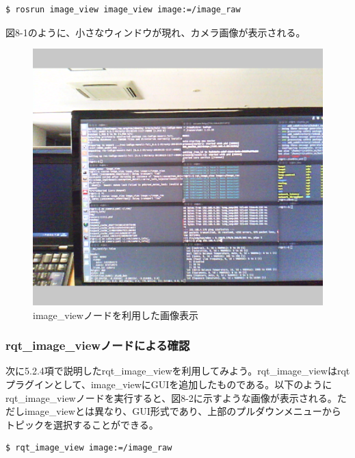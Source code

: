 \begin{lstlisting}[language=ROS]
$ rosrun image_view image_view image:=/image_raw
\end{lstlisting}

図8-1のように、小さなウィンドウが現れ、カメラ画像が表示される。

\begin{figure}[ht]
  \centering
  \includegraphics[width=\columnwidth]{pictures/chapter8/pic_08_01.png}
  \caption{image\_viewノードを利用した画像表示}
\end{figure}


\subsubsection{rqt\_image\_viewノードによる確認}

次に5.2.4項で説明したrqt\_image\_viewを利用してみよう。rqt\_image\_viewはrqtプラグインとして、image\_viewにGUIを追加したものである。以下のようにrqt\_image\_viewノードを実行すると、図8-2に示すような画像が表示される。ただしimage\_viewとは異なり、GUI形式であり、上部のプルダウンメニューからトピックを選択することができる。

\begin{lstlisting}[language=ROS]
$ rqt_image_view image:=/image_raw
\end{lstlisting}

